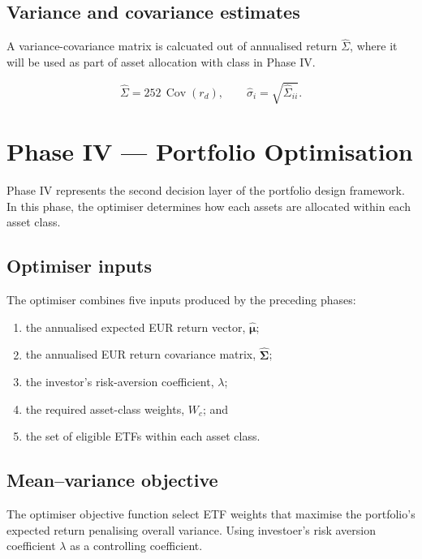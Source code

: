 \documentclass[11pt,a4paper]{article}
\begin{document}
\subsection{Variance and covariance estimates}

A variance-covariance matrix is calcuated out of annualised return $\hat{\Sigma}$, where it will be used as part of asset allocation with class in Phase IV.

\begin{equation}
  \hat\Sigma=252\,\operatorname{Cov}(r_d),
  \qquad
  \hat\sigma_i=\sqrt{\hat\Sigma_{ii}}.
\end{equation}

\section{Phase IV --- Portfolio Optimisation}
\label{sec:phase-four}

Phase IV represents the second decision layer of the portfolio design framework. In this phase, the optimiser determines how each assets are allocated within each asset class.

\subsection{Optimiser inputs}

The optimiser combines five inputs produced by the preceding phases:

\begin{enumerate}
  \item the annualised expected EUR return vector, \(\hat{\boldsymbol{\mu}}\);
  \item the annualised EUR return covariance matrix, \(\hat{\boldsymbol{\Sigma}}\);
  \item the investor's risk-aversion coefficient, \(\lambda\);
  \item the required asset-class weights, \(W_c\); and
  \item the set of eligible ETFs within each asset class.
\end{enumerate}

\subsection{Mean--variance objective}

The optimiser objective function select ETF weights that maximise the portfolio's expected return penalising overall variance. Using investoer's risk aversion coefficient $\lambda$ as a controlling coefficient.
\end{document}
